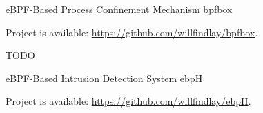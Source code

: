 

\begin{cventries}

  \cventry
    {eBPF-Based Process Confinement Mechanism} %
    {bpfbox} %
    {} %
    {} %
    {
      \begin{cvitems} %
        \item Project is available: \url{https://github.com/willfindlay/bpfbox}.
        \item TODO
      \end{cvitems}
    }

  \cventry
    {eBPF-Based Intrusion Detection System} %
    {ebpH} %
    {} %
    {} %
    {
      \begin{cvitems} %
        \item Project is available: \url{https://github.com/willfindlay/ebpH}.
      \end{cvitems}
    }

\end{cventries}
